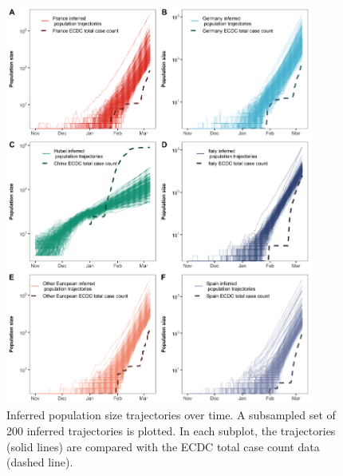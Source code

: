 \documentclass[12pt,]{article}
\begin{document}
\begin{figure}[ht]
    \centering
    \includegraphics[width=0.9\textwidth]{201014_europe2_figtraj02.png}
    \caption{Inferred population size trajectories over time. A subsampled set of 200 inferred trajectories is plotted. In each subplot, the trajectories (solid lines) are compared with the ECDC total case count data (dashed line).}
    \label{fig:trajs}
\end{figure}
\end{document}
